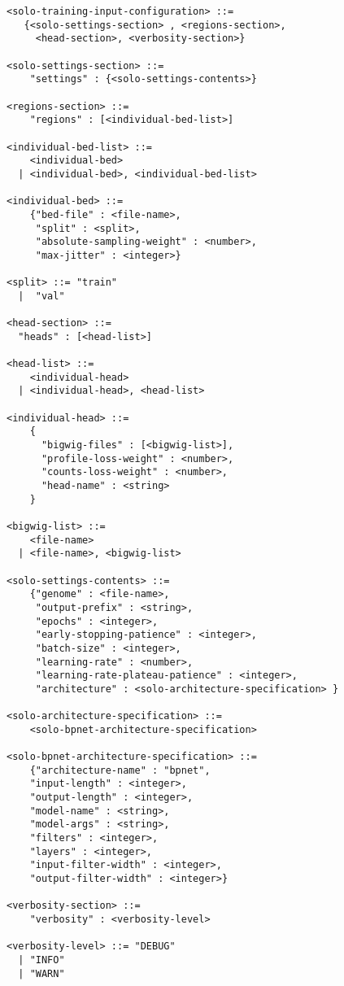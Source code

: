 \documentclass{article}
\begin{document}
\begin{lstlisting}
<solo-training-input-configuration> ::= 
   {<solo-settings-section> , <regions-section>, 
     <head-section>, <verbosity-section>}

<solo-settings-section> ::= 
    "settings" : {<solo-settings-contents>}

<regions-section> ::= 
    "regions" : [<individual-bed-list>]

<individual-bed-list> ::= 
    <individual-bed> 
  | <individual-bed>, <individual-bed-list>

<individual-bed> ::= 
    {"bed-file" : <file-name>,
     "split" : <split>,
     "absolute-sampling-weight" : <number>,
     "max-jitter" : <integer>}

<split> ::= "train"
  |  "val" 

<head-section> ::= 
  "heads" : [<head-list>]

<head-list> ::= 
    <individual-head>
  | <individual-head>, <head-list>

<individual-head> ::=
    {
      "bigwig-files" : [<bigwig-list>],
      "profile-loss-weight" : <number>,
      "counts-loss-weight" : <number>,
      "head-name" : <string>
    }

<bigwig-list> ::=
    <file-name> 
  | <file-name>, <bigwig-list>

<solo-settings-contents> ::= 
    {"genome" : <file-name>, 
     "output-prefix" : <string>, 
     "epochs" : <integer>, 
     "early-stopping-patience" : <integer>, 
     "batch-size" : <integer>, 
     "learning-rate" : <number>, 
     "learning-rate-plateau-patience" : <integer>,
     "architecture" : <solo-architecture-specification> } 

<solo-architecture-specification> ::= 
    <solo-bpnet-architecture-specification>

<solo-bpnet-architecture-specification> ::= 
    {"architecture-name" : "bpnet",
    "input-length" : <integer>, 
    "output-length" : <integer>,
    "model-name" : <string>,
    "model-args" : <string>,
    "filters" : <integer>,
    "layers" : <integer>,
    "input-filter-width" : <integer>,
    "output-filter-width" : <integer>}

<verbosity-section> ::= 
    "verbosity" : <verbosity-level>

<verbosity-level> ::= "DEBUG"
  | "INFO"
  | "WARN"
\end{lstlisting}
\end{document}
